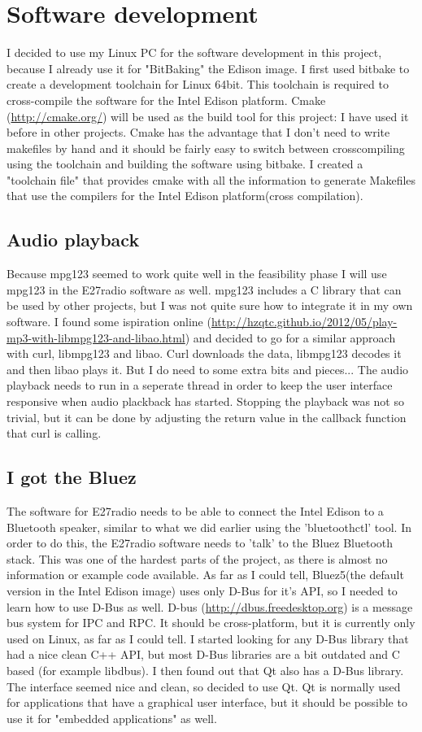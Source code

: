 \documentclass[12pt,a4paper]{scrreprt}
\begin{document}
\section{Software development}
I decided to use my Linux PC for the software development in this project, because I already use it for "BitBaking" the Edison image. 
I first used bitbake to create a development toolchain for Linux 64bit. This toolchain is required to cross-compile the software for the Intel Edison platform.
Cmake (\url{http://cmake.org/}) will be used as the build tool for this project: I have used it before in other projects.
Cmake has the advantage that I don't need to write makefiles by hand and it should be fairly easy to switch between crosscompiling using the toolchain and building the software using bitbake.
I created a "toolchain file" that provides cmake with all the information to generate Makefiles that use the compilers for the Intel Edison platform(cross compilation). 

\subsection{Audio playback}
Because mpg123 seemed to work quite well in the feasibility phase I will use mpg123 in the E27radio software as well. mpg123 includes a C library that can be used by other projects, but I was not quite sure how to integrate it in my own software.
I found some ispiration online (\url{http://hzqtc.github.io/2012/05/play-mp3-with-libmpg123-and-libao.html}) and decided to go for a similar approach with curl, libmpg123 and libao. 
Curl downloads the data, libmpg123 decodes it and then libao plays it.
But I do need to some extra bits and pieces... 
The audio playback needs to run in a seperate thread in order to keep the user interface responsive when audio plackback has started. Stopping the playback was not so trivial, but it can be done by adjusting the return value in the  callback function that curl is calling.  


\subsection{I got the Bluez}
The software for E27radio needs to be able to connect the Intel Edison to a Bluetooth speaker, similar to what we did earlier using the 'bluetoothctl' tool.
In order to do this, the E27radio software needs to 'talk' to the Bluez Bluetooth stack. 
This was one of the hardest parts of the project, as there is almost no information or example code available. 
As far as I could tell, Bluez5(the default version in the Intel Edison image) uses only D-Bus for it's API, so I needed to learn how to use D-Bus as well.
D-bus  (\url{http://dbus.freedesktop.org}) is a message bus system for IPC and RPC. It should be cross-platform, but it is currently only used on Linux, as far as I could tell.
I started looking for any D-Bus library that had a nice clean C++ API, but most D-Bus libraries are a bit outdated and C based (for example libdbus).
I then found out that Qt also has a D-Bus library. The interface seemed nice and clean, so decided to use Qt. 
Qt is normally used for applications that have a graphical user interface, but it should be possible to use it for "embedded applications" as well.
\end{document}
